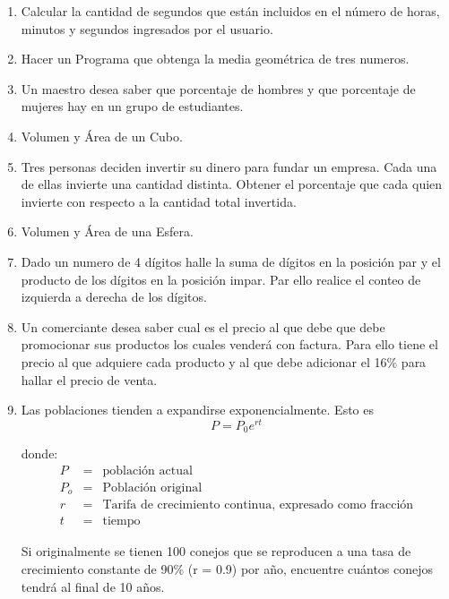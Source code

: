 \documentclass{scrartcl}
\begin{document}
\begin{enumerate}
		\item Calcular la cantidad de segundos que están incluidos en el número de horas,
		minutos y segundos ingresados por el usuario.
		
		\item Hacer un Programa que obtenga la media geométrica de tres numeros.
		
		\item Un maestro desea saber que porcentaje de hombres y que porcentaje de		mujeres hay en un grupo de estudiantes.
		
		\item Volumen y Área de un Cubo.
		
		\item Tres personas deciden invertir su dinero para fundar un empresa. Cada una de ellas invierte una cantidad distinta. Obtener el porcentaje que cada quien invierte con respecto a la cantidad total invertida.
		
		\item Volumen y Área de una Esfera.	
		
		\item Dado un numero de 4 dígitos halle la suma de dígitos en la posición par y el producto de los dígitos en la posición impar. Par ello realice el conteo de izquierda a derecha de los dígitos.
		\item Un comerciante desea saber cual es el precio al que debe que debe promocionar sus productos los cuales venderá con factura. Para ello tiene el precio al que adquiere cada producto y al que debe adicionar el 16\% para hallar el precio de venta.
        
        \item Las poblaciones tienden a expandirse exponencialmente. Esto es 
        \begin{equation*}
        	P = P_{0}e^{rt}
        \end{equation*}
        
        donde:
		\begin{eqnarray*}
			P		   &=&	\mbox{población actual} \\
			P_{o}  &=& \mbox{Población original} \\
			r 			& = & \mbox{Tarifa de crecimiento continua, expresado como fracción}\\
			t 			& = & \mbox{tiempo}
		\end{eqnarray*}
		
		Si originalmente se tienen 100 conejos que se reproducen a una tasa de crecimiento constante de 90\% (r = 0.9) por año, encuentre cuántos conejos tendrá al final de 10 años.
		

\end{enumerate}
\end{document}
